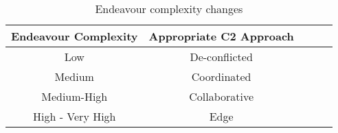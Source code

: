 \begin{table}%
	\small
	\fontsize{6}{6}\selectfont
	\centering
	\caption{Endeavour complexity  changes}
	\label{table:table02}
	
	\begin{tabular}{ccccc}
	\hline
		\textbf{Endeavour Complexity}
		& \textbf{Appropriate C2 Approach} \\ [1ex]
	\hline	
	
	Low & De-conflicted \\[1ex]
	Medium & Coordinated \\[1ex]
	Medium-High & Collaborative \\[1ex]
	High - Very High & Edge \\[1ex]
	\hline
	\end{tabular}
\end{table} 